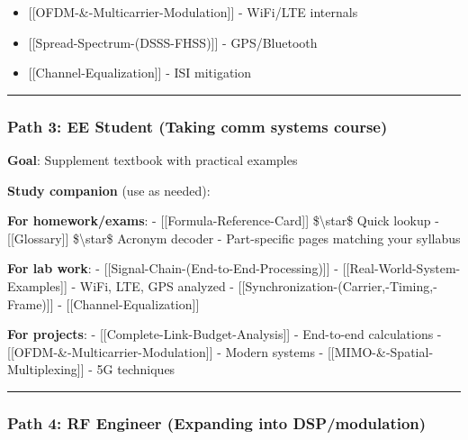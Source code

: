 \begin{enumerate}
  \begin{itemize}
  \tightlist
  \item
    {[}{[}OFDM-\&-Multicarrier-Modulation{]}{]} - WiFi/LTE internals
  \item
    {[}{[}Spread-Spectrum-(DSSS-FHSS){]}{]} - GPS/Bluetooth
  \item
    {[}{[}Channel-Equalization{]}{]} - ISI mitigation
  \end{itemize}
\end{enumerate}

\begin{center}\rule{0.5\linewidth}{0.5pt}\end{center}

\subsubsection{\texorpdfstring{Path 3: \textbf{EE Student} (Taking comm
systems
course)}{Path 3: EE Student (Taking comm systems course)}}\label{path-3-ee-student-taking-comm-systems-course}

\textbf{Goal}: Supplement textbook with practical examples

\textbf{Study companion} (use as needed):

\textbf{For homework/exams}: - {[}{[}Formula-Reference-Card{]}{]}
\$\textbackslash star\$ Quick lookup - {[}{[}Glossary{]}{]}
\$\textbackslash star\$ Acronym decoder - Part-specific pages matching
your syllabus

\textbf{For lab work}: -
{[}{[}Signal-Chain-(End-to-End-Processing){]}{]} -
{[}{[}Real-World-System-Examples{]}{]} - WiFi, LTE, GPS analyzed -
{[}{[}Synchronization-(Carrier,-Timing,-Frame){]}{]} -
{[}{[}Channel-Equalization{]}{]}

\textbf{For projects}: - {[}{[}Complete-Link-Budget-Analysis{]}{]} -
End-to-end calculations - {[}{[}OFDM-\&-Multicarrier-Modulation{]}{]} -
Modern systems - {[}{[}MIMO-\&-Spatial-Multiplexing{]}{]} - 5G
techniques

\begin{center}\rule{0.5\linewidth}{0.5pt}\end{center}

\subsubsection{\texorpdfstring{Path 4: \textbf{RF Engineer} (Expanding
into
DSP/modulation)}{Path 4: RF Engineer (Expanding into DSP/modulation)}}\label{path-4-rf-engineer-expanding-into-dspmodulation}

